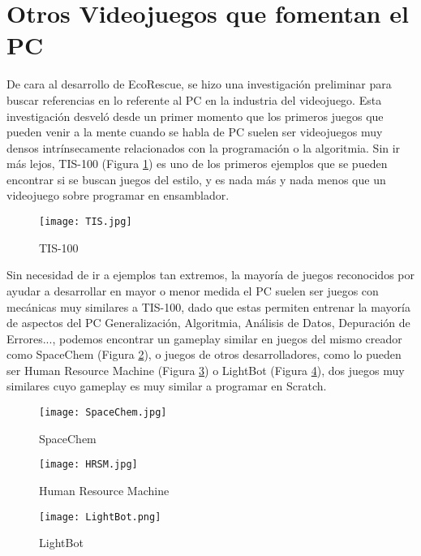 \section{Otros Videojuegos que fomentan el PC}
De cara al desarrollo de EcoRescue, se hizo una investigación preliminar para buscar referencias en lo referente al PC en la industria del videojuego. Esta investigación desveló desde un primer momento que los primeros juegos que pueden venir a la mente cuando se habla de PC suelen ser videojuegos muy densos intrínsecamente relacionados con la programación o la algoritmia. Sin ir más lejos, TIS-100\cite{TIS-100} (Figura \ref{fig:tis100}) es uno de los primeros ejemplos que se pueden encontrar si se buscan juegos del estilo, y es nada más y nada menos que un videojuego sobre programar en ensamblador. 

\begin{figure}[H]
    \centering
      \texttt{[image: TIS.jpg]}
    \caption{TIS-100}
    \label{fig:tis100}
\end{figure}

Sin necesidad de ir a ejemplos tan extremos, la mayoría de juegos reconocidos por ayudar a desarrollar en mayor o menor medida el PC suelen ser juegos con mecánicas muy similares a TIS-100, dado que estas permiten entrenar la mayoría de aspectos del PC Generalización, Algoritmia, Análisis de Datos, Depuración de Errores..., podemos encontrar un gameplay similar en juegos del mismo creador como SpaceChem\cite{SpaceChem} (Figura \ref{fig:spaceChem}), o juegos de otros desarrolladores, como lo pueden ser Human Resource Machine\cite{hrsm} (Figura \ref{fig:hsrm}) o LightBot\cite{lightbot} (Figura \ref{fig:lightbot}), dos juegos muy similares cuyo gameplay es muy similar a programar en Scratch\cite{Scratch}.

\begin{figure}[H]
    \centering
      \texttt{[image: SpaceChem.jpg]}
    \caption{SpaceChem}
    \label{fig:spaceChem}
\end{figure}

\begin{figure}[H]
    \centering
      \texttt{[image: HRSM.jpg]}
    \caption{Human Resource Machine}
    \label{fig:hsrm}
\end{figure}

\begin{figure}[H]
    \centering
      \texttt{[image: LightBot.png]}
    \caption{LightBot}
    \label{fig:lightbot}
\end{figure}


